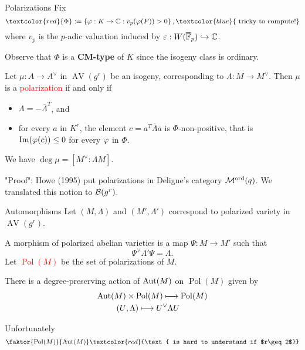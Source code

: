 \documentclass[usenames,dvipsnames,handout]{beamer}
\DeclareMathOperator{\AV}{AV}
\DeclareMathOperator{\Pol}{Pol}
\newcommand{\Modord}[1]{\cM^{\text{ord}}({#1})}
\newcommand{\red}[1]{\textcolor{red}{#1}}
\newcommand{\blue}[1]{\textcolor{blue}{#1}}
\begin{document}
\begin{frame}{ Polarizations }
Fix
\[ \red{ \Phi }:=\set{ \vphi:K \to \C : v_p(\vphi(F))>0 }, \blue{\text{ tricky to compute!}} \]
where $v_p$ is the $p$-adic valuation induced by $\varepsilon: W(\overline{\mathbb{F}}_p)\hookrightarrow \mathbb{C}$.

\pause Observe that $\Phi$ is a \textbf{CM-type} of $K$ since the isogeny class is ordinary.

\pause
\begin{thm}
 Let $\mu:A\to A^\vee$ in $\AV(g^r)$ be an isogeny, corresponding to $\Lambda:M\to M^\vee$.
 \pause Then $\mu$ is a \red{polarization} if and only if
 \begin{itemize}
  \item $\Lambda = -\overline\Lambda^T$, and
  \item for every $a$ in $K^r$, the element
    $c=a^T\overline\Lambda \overline a $
    is $\Phi$-non-positive, that is $\operatorname{Im}({\varphi}(c)) \leq 0$ for every ${\varphi}$ in $\Phi$.
 \end{itemize}
 \pause We have $\deg \mu = [M^\vee : \Lambda M]$.
\end{thm}

\pause "Proof": Howe (1995) put polarizations in Deligne's category $\Modord{q}$. We translated this notion to ${\mathcal B}(g^r)$. 

\end{frame}

\begin{frame}{ Automorphisms }
Let $(M,\Lambda)$ and $(M',\Lambda')$ correspond to polarized variety in $\AV(g^r)$.

\pause A morphism of polarized abelian varieties is a map $\Psi:M \to M'$ such that
\[ \Psi^\vee\Lambda'\Psi = \Lambda. \]
\pause Let \red{$\Pol(M)$} be the set of polarizations of $M$.
\pause
\begin{thm}
There is a degree-preserving action of $\operatorname{Aut}(M)$ on $\Pol(M)$ given by
\begin{align*}
\Aut(M) & \times \Pol(M) \longmapsto \Pol(M)\\
(U &, \Lambda) \longmapsto U^\vee \Lambda U
\end{align*}
\end{thm}
\pause Unfortunately
\[ \faktor{\Pol(M)}{\Aut(M)} \red{\text{ is hard to understand if $r\geq 2$}} \]
\end{frame}
\end{document}
